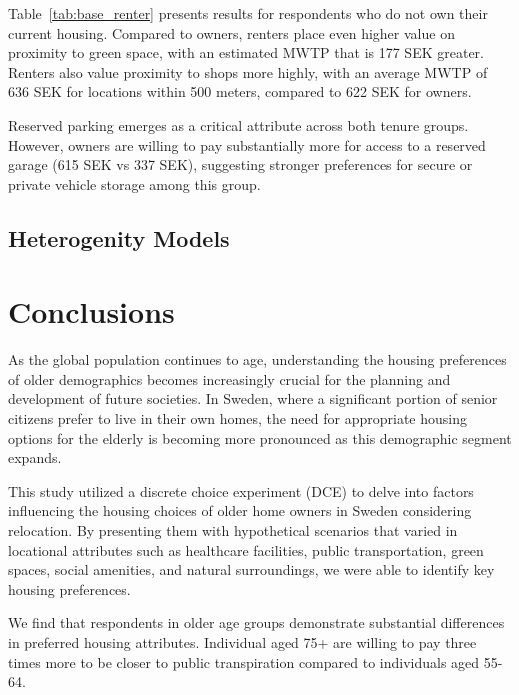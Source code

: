 \documentclass[3p,11pt ]{elsarticle}
\begin{document}
Table~\ref{tab:base_renter} presents results for respondents who do not own their current housing. Compared to owners, renters place even higher value on proximity to green space, with an estimated MWTP that is 177 SEK greater. Renters also value proximity to shops more highly, with an average MWTP of 636 SEK for locations within 500 meters, compared to 622 SEK for owners.

Reserved parking emerges as a critical attribute across both tenure groups. However, owners are willing to pay substantially more for access to a reserved garage (615 SEK vs 337 SEK),
suggesting stronger preferences for secure or private vehicle storage among this group.










\clearpage




\subsection{Heterogenity Models}






\section{Conclusions}

As the global population continues to age, understanding the housing preferences of older demographics becomes increasingly crucial for the planning and development of future societies. In Sweden, where a significant portion of senior citizens prefer to live in their own homes, the need for appropriate housing options for the elderly is becoming more pronounced as this demographic segment expands. 

This study utilized a discrete choice experiment (DCE) to delve into factors influencing the housing choices of older home owners in Sweden considering relocation.
By presenting them with hypothetical scenarios that varied in locational attributes such as healthcare facilities, public transportation, green spaces, social amenities, and natural surroundings, we were able to identify key housing preferences.


We find that respondents in older age groups demonstrate substantial differences in preferred housing attributes.
Individual aged 75+ are willing to pay three times more to be closer to public transpiration compared to individuals aged 55-64.
\end{document}
